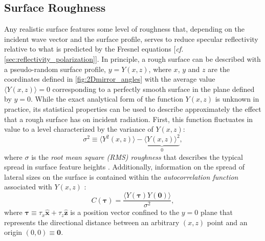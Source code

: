 \subsection{Surface Roughness}\label{sec:rough_surface}
Any realistic surface features some level of roughness that, depending on the incident wave vector and the surface profile, serves to reduce specular reflectivity relative to what is predicted by the Fresnel equations [\emph{cf.\@} \cref{sec:reflectivity_polarization}]. 
In principle, a rough surface can be described with a pseudo-random surface profile, $y = Y(x,z)$, where $x$, $y$ and $z$ are the coordinates defined in \cref{fig:2Dmirror_angles} with the average value $\langle Y(x,z) \rangle = 0$ corresponding to a perfectly smooth surface in the plane defined by $y = 0$. 
While the exact analytical form of the function $Y(x,z)$ is unknown in practice, its statistical properties can be used to describe approximately the effect that a rough surface has on incident radiation. 
First, this function fluctuates in value to a level characterized by the variance of $Y(x,z)$:
\begin{equation}\label{eq:surface_variance}
 \sigma^2 \equiv \langle Y^2(x,z) \rangle - \underbrace{\langle Y(x,z) \rangle^2}_0 ,
 \end{equation} 
where $\sigma$ is the \emph{root mean square (RMS) roughness} that describes the typical spread in surface feature heights \cite{Beckmann63,Ogilvy87,Als-Nielsen11,Sentenac2009}.   
Additionally, information on the spread of lateral sizes on the surface is contained within the \emph{autocorrelation function} associated with $Y(x,z)$ \cite{Beckmann63,Hogrefe87,Ogilvy87,Sentenac2009}: 
\begin{equation}\label{eq:auto_correlation}
 C (\mathbold{\tau}) = \frac{\langle Y(\mathbold{\tau}) Y(\mathbf{0}) \rangle}{\sigma^2} ,
 \end{equation}
where $\mathbold{\tau} \equiv \tau_x  \mathbold{\hat{x}} + \tau_z  \mathbold{\hat{z}}$ is a position vector confined to the $y = 0$ plane that represents the directional distance between an arbitrary $(x,z)$ point and an origin $(0,0) \equiv \mathbf{0}$. 

